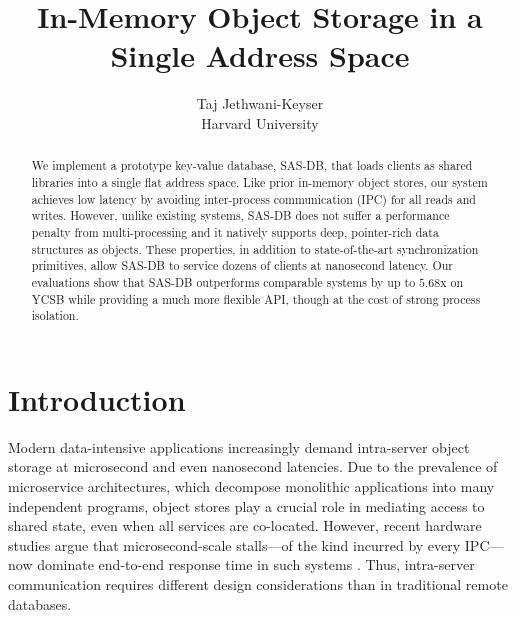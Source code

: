 

\date{}

\title{\Large \bf In-Memory Object Storage in a Single Address Space}

\author{
	{\rm Taj Jethwani-Keyser}\\
	Harvard University
} %

\maketitle

\begin{abstract}
    We implement a prototype key-value database, SAS-DB, that loads clients as
    shared libraries into a single flat address space. Like prior in-memory
    object stores, our system achieves low latency by avoiding inter-process
    communication (IPC) for all reads and writes. However, unlike existing
    systems, SAS-DB does not suffer a performance penalty from multi-processing
    and it natively supports deep, pointer-rich data structures as objects.
    These properties, in addition to state-of-the-art synchronization
    primitives, allow SAS-DB to service dozens of clients at nanosecond latency.
    Our evaluations show that SAS-DB outperforms comparable systems by up to
    $5.68$x on YCSB while providing a much more flexible API, though at the cost
    of strong process isolation.
\end{abstract}


\section{Introduction}
\label{sec:intro}

Modern data-intensive applications increasingly demand intra-server object
storage at microsecond and even nanosecond latencies. Due to the prevalence of
microservice architectures, which decompose monolithic applications into many
independent programs, object stores play a crucial role in mediating access to
shared state, even when all services are co-located. However, recent hardware
studies argue that microsecond-scale stalls---of the kind incurred by every
IPC---now dominate end-to-end response time in such systems
\cite{barroso17killer, gan19deathstar, lightning22}. Thus, intra-server
communication requires different design considerations than in traditional
remote databases.

